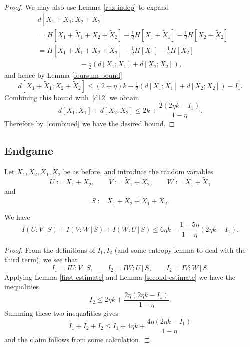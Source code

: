 \begin{proof}
  We may also use Lemma \ref{ruz-indep} to expand
  \begin{align*}
   & d[X_1+\tilde X_1;X_2+\tilde X_2] \\ &= H[ X_1+\tilde X_1 + X_2 + \tilde X_2 ]  - \tfrac{1}{2} H[X_1+\tilde X_1] - \tfrac{1}{2} H[X_2+\tilde X_2] \\
    &= H[ X_1+\tilde X_1 + X_2 + \tilde X_2]  - \tfrac{1}{2} H[X_1] - \tfrac{1}{2} H[X_2]  \\ & \qquad\qquad\qquad   - \tfrac{1}{2} \left( d[X_1;X_1] + d[X_2; X_2] \right),
  \end{align*}
  and hence by Lemma \ref{foursum-bound}
  \[
    d[X_1+\tilde X_1; X_2+\tilde X_2] \leq (2+\eta) k - \tfrac{1}{2} \left( d[X_1;X_1] + d[X_2;X_2] \right) - I_1.
  \]
  Combining this bound with~\eqref{d12} we obtain
  \[ d[X_1;X_1] + d[X_2;X_2] \leq 2 k + \frac{2(2 \eta k - I_1)}{1-\eta}. \]
  Therefore by~\eqref{combined} we have the desired bound.
\end{proof}


\subsection{Endgame}

Let $X_1,X_2,\tilde X_1,\tilde X_2$ be as before, and introduce the random variables
\[ U := X_1 + X_2, \qquad V := \tilde X_1 + X_2, \qquad W := X_1 + \tilde X_1\] and
\[   S := X_1 + X_2 + \tilde X_1 + \tilde X_2.\]

\begin{lemma}\label{uvw-s}
We have
$$
I(U : V \, | \, S) + I(V : W \, | \,S) + I(W : U \, | \, S) \leq 6 \eta k - \frac{1 - 5 \eta}{1-\eta} (2 \eta k - I_1).
$$
\end{lemma}

\begin{proof}
From the definitions of $I_1,I_2$ (and some entropy lemma to deal with the third term), we see that
\[
  I_1 = I{U : V \, | \, S}, \qquad I_2 = I{W : U \, | \, S}, \qquad I_2 = I{V : W \, | \,S}.
\]
Applying Lemma \ref{first-estimate} and Lemma \ref{second-estimate} we have the inequalities
\[   I_2 \leq 2 \eta k + \frac{2\eta(2 \eta k - I_1)}{1-\eta} .
\]
Summing these two inequalities gives
$$
   I_1 + I_2 + I_2 \leq I_1+4\eta k+ \frac{4\eta(2 \eta k - I_1)}{1-\eta}
$$
and the claim follows from some calculation.
\end{proof}

